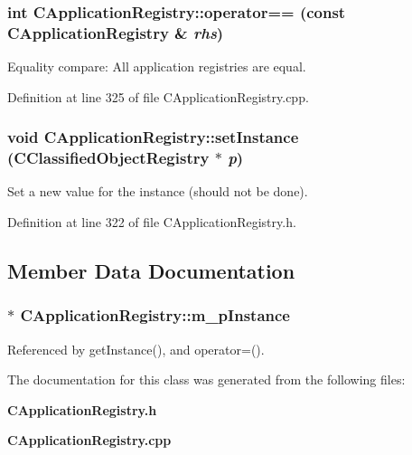 \subsubsection{\setlength{\rightskip}{0pt plus 5cm}int CApplication\-Registry::operator== (const CApplication\-Registry \& {\em rhs})}\label{classCApplicationRegistry_a4}


Equality compare: All application registries are equal. 

Definition at line 325 of file CApplication\-Registry.cpp.
\subsubsection{\setlength{\rightskip}{0pt plus 5cm}void CApplication\-Registry::set\-Instance ({\bf CClassified\-Object\-Registry} $\ast$ {\em p})\hspace{0.3cm}{\tt  [inline, static, protected]}}\label{classCApplicationRegistry_e0}


Set a new value for the instance (should not be done).



Definition at line 322 of file CApplication\-Registry.h.

\subsection{Member Data Documentation}
\subsubsection{ $\ast$ CApplication\-Registry::m\_\-p\-Instance\hspace{0.3cm}{\tt  [static, private]}}\label{classCApplicationRegistry_r0}




Referenced by get\-Instance(), and operator=().

The documentation for this class was generated from the following files:\begin{CompactItemize}
\item 
{\bf CApplication\-Registry.h}\item 
{\bf CApplication\-Registry.cpp}\end{CompactItemize}

